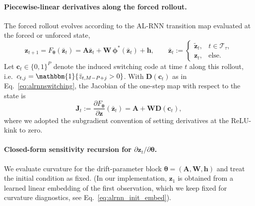 \documentclass[twoside]{article}
\theoremstyle{plain}
\theoremstyle{definition}
\theoremstyle{remark}
\begin{document}
\paragraph{Piecewise-linear derivatives along the forced rollout.}
The forced rollout evolves according to the AL-RNN transition map evaluated at the forced or unforced state,
\begin{equation}
\bm{z}_{t+1} = F_{\bm \theta}(\bar{\bm z}_t)
= \bm{A}\bar{\bm z}_t + \bm{W}\,\bm\phi^\ast(\bar{\bm z}_t) + \bm{h},
\qquad \bar{\bm z}_t:=\begin{cases}\tilde{\bm z}_t,& t\in\mathcal T_\tau,\\ \bm z_t,&\text{else.}\end{cases}
\end{equation}
Let $\bm c_t\in\{0,1\}^P$ denote the induced switching code at time $t$ along this rollout, i.e.\ \;$c_{t,j}=\mathbbm{1}\{\bar z_{t,M-P+j}>0\}$. With $\bm D(\bm c_t)$ as in Eq.~\eqref{eq:alrnnswitching}, the Jacobian of the one-step map with respect to the state is
\begin{equation}
\label{eq:a1:stepjacobian}
\bm{J}_t := \frac{\partial F_{\bm \theta}}{\partial \bm{z}}(\bar{\bm z}_t)
= \bm{A} + \bm{W}\bm D(\bm c_t),
\end{equation}
where we adopted the subgradient convention of setting derivatives at the ReLU-kink to zero.
\paragraph{Closed-form sensitivity recursion for $\partial \bm{z}_t/\partial \bm\theta$.}
We evaluate curvature for the drift-parameter block $\bm\theta=(\bm A,\bm W,\bm h)$ and treat the initial condition as fixed. (In our implementation, $\bm z_1$ is obtained from a learned linear embedding of the first observation, which we keep fixed for curvature diagnostics, see Eq.~\eqref{eq:alrnn_init_embed}).
\end{document}
